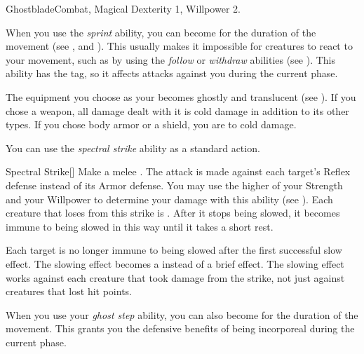     \begin{feat}{Ghostblade}{Combat, Magical}
        \featpre Dexterity 1, Willpower 2.

         When you use the \textit{sprint} ability, you can become  for the duration of the movement (see , and ).
        This usually makes it impossible for creatures to react to your movement, such as by using the \textit{follow} or \textit{withdraw} abilities (see ).
        This ability has the  tag, so it affects attacks against you during the current phase.

         The equipment you choose as your  becomes ghostly and translucent (see ).
        If you chose a weapon, all damage dealt with it is cold damage in addition to its other types.
        If you chose body armor or a shield, you are  to cold damage.

         You can use the \textit{spectral strike} ability as a standard action.
        \begin{activeability}{Spectral Strike}[]
            \rankline
            Make a melee .
            The attack is made against each target's Reflex defense instead of its Armor defense.
            You may use the higher of your Strength and your Willpower to determine your damage with this ability (see ).
            Each creature that loses  from this strike is  \slowed.
            After it stops being slowed, it becomes immune to being slowed in this way until it takes a short rest.

            \rankline
             Each target is no longer immune to being slowed after the first successful slow effect.
             The slowing effect becomes a  instead of a brief effect.
             The slowing effect works against each creature that took damage from the strike, not just against creatures that lost hit points.
        \end{activeability}

         When you use your \textit{ghost step} ability, you can also become  for the duration of the movement.
        This grants you the defensive benefits of being incorporeal during the current phase.


\end{feat}
